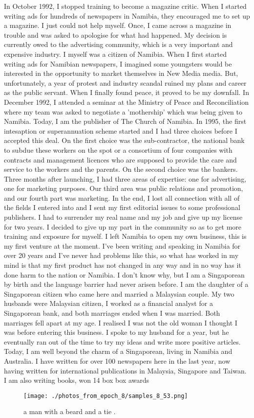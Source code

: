 \documentclass{article}%
\begin{document}
In October 1992, I stopped training to become a magazine critic. When I started writing ads for hundreds of newspapers in Namibia, they encouraged me to set up a magazine. I just could not help myself. Once, I came across a magazine in trouble and was asked to apologise for what had happened. My decision is currently owed to the advertising community, which is a very important and expensive industry. I myself was a citizen of Namibia. When I first started writing ads for Namibian newspapers, I imagined some youngsters would be interested in the opportunity to market themselves in New Media media. But, unfortunately, a year of protest and industry scandal ruined my plans and career as the public servant. When I finally found peace, it proved to be my downfall. In December 1992, I attended a seminar at the Ministry of Peace and Reconciliation where my team was asked to negotiate a 'mothership' which was being given to Namibia. Today, I am the publisher of The Church of Namibia. In 1995, the first intesaption or superannuation scheme started and I had three choices before I accepted this deal. On the first choice was the sub{-}contractor, the national bank to subdue these workers on the spot or a consortium of four companies with contracts and management licences who are supposed to provide the care and service to the workers and the parents. On the second choice was the bankers.\newline%
Three months after launching, I had three areas of expertise: one for advertising, one for marketing purposes. Our third area was public relations and promotion, and our fourth part was marketing. In the end, I lost all connection with all of the fields I entered into and I sent my first editorial issues to some professional publishers. I had to surrender my real name and my job and give up my license for two years. I decided to give up my part in the community so as to get more training and exposure for myself. I left Namibia to open my own business, this is my first venture at the moment. I've been writing and speaking in Namibia for over 20 years and I've never had problems like this, so what has worked in my mind is that my first product has not changed in any way and in no way has it done harm to the nation or Namibia.\newline%
I don't know why, but I am a Singaporean by birth and the language barrier had never arisen before. I am the daughter of a Singaporean citizen who came here and married a Malaysian couple. My two husbands were Malaysian citizen, I worked as a financial analyst for a Singaporean bank, and both marriages ended when I was married. Both marriages fell apart at my age. I realised I was not the old woman I thought I was before entering this business. I spoke to my husband for a year, but he eventually ran out of the time to try my ideas and write more positive articles.\newline%
Today, I am well beyond the charm of a Singaporean, living in Namibia and Australia. I have written for over 100 newspapers here in the last year, now having written for international publications in Malaysia, Singapore and Taiwan. I am also writing books, won 14 box box awards

%


\begin{figure}[h!]%
\centering%
\texttt{[image: ./photos\_from\_epoch\_8/samples\_8\_53.png]}%
\caption{a man with a beard and a tie .}%
\end{figure}

%
\end{document}
